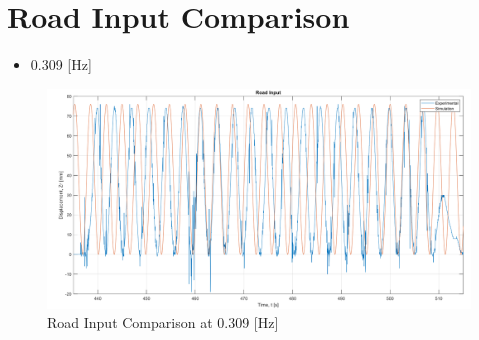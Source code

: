 \section{Road Input Comparison}
\begin{itemize}
	\item 0.309 [Hz]
\end{itemize}
\begin{figure}[H]
	\centering
	\includegraphics[width=0.9\linewidth]{figures/0.309 RI.png}
	\caption{Road Input Comparison at 0.309 [Hz]}
	\label{fig:Road Input Comparison at 0.309}
\end{figure}

